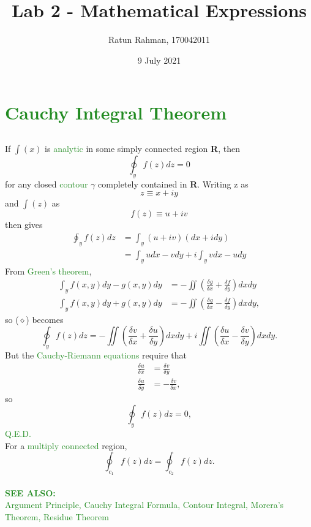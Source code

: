 \documentclass[11pt]{article}
\title{Lab 2 - Mathematical Expressions}
\author{Ratun Rahman, 170042011}
\date{9 July 2021}
\begin{document}
\begin{titlepage}
\maketitle
\end{titlepage}

\section*{\textcolor{ForestGreen}{Cauchy Integral Theorem}}
\subsection*{}
If \(\int(x)\) is \textcolor{ForestGreen}{analytic} in some simply connected region \textbf{R}, then 
\begin{equation}
 \oint_y f(z)dz= 0 
\end{equation}
for any closed \textcolor{ForestGreen}{contour} \(\gamma\) completely contained in \textbf{R}. Writing z as 
\begin{equation} z \equiv x + iy \end{equation}
and \(\int(z)\) as
\begin{equation} f(z) \equiv u + iv \end{equation}
then gives
\begin{align}
\oint_y f(z)dz &= \int_y(u+iv) (dx+idy) \\
 &= \int_y udx-vdy + i\int_y vdx-udy
\end{align}
From \textcolor{ForestGreen}{Green's theorem}, 
\begin{align}
\int_y f(x,y)dy - g(x,y)dy &= -\iint \left(\frac{\delta g}{\delta x}+ \frac{\delta f}{\delta y} \right) dx dy \\
\int_y f(x,y)dy + g(x,y)dy &= -\iint \left(\frac{\delta g}{\delta x}- \frac{\delta f}{\delta y} \right) dx dy ,
\end{align}
so (\(\diamond\)) becomes
\begin{equation} \oint_y f(z)dz = -\iint \left(\frac{\delta v}{\delta x}+ \frac{\delta u}{\delta y} \right) dx dy +i \iint \left(\frac{\delta u}{\delta x}- \frac{\delta v}{\delta y} \right) dx dy. \end{equation}
But the \textcolor{ForestGreen}{Cauchy-Riemann equations} require that
\begin{align}
\frac{\delta u}{\delta x} &= \frac{\delta v}{\delta y} \\
\frac{\delta u}{\delta y} &= -\frac{\delta v}{\delta x},
\end{align}
so
\begin{equation} \oint_y f(z)dz = 0, \end{equation}
\textcolor{ForestGreen}{Q.E.D.} \\
For a \textcolor{ForestGreen}{multiply connected} region, 
\begin{equation} \oint_{c_1} f(z)dz = \oint_{c_2} f(z)dz. \end{equation}
\\
\textcolor{ForestGreen}{\textbf{SEE ALSO:} \\
 Argument Principle, Cauchy Integral Formula, Contour Integral, Morera's Theorem, Residue Theorem}
\end{document}
